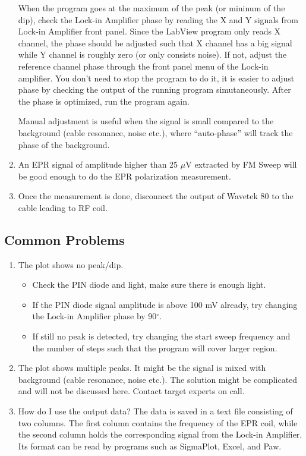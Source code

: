 \begin{enumerate}
When the program goes at the maximum of the peak (or mininum of the dip), 
check the Lock-in Amplifier phase by reading the X and Y signals from Lock-in
Amplifier front panel.  Since the LabView program only reads X channel, the 
phase should be adjusted such that X channel has a big signal while 
Y channel is roughly zero (or only consists noise).  If not, adjust the 
reference channel phase through the front panel menu of the Lock-in amplifier.
You don't need to stop the program to do it, it is easier to adjust phase
by checking the output of the running program simutaneously.  
After the phase is optimized, run the program again.

Manual adjustment is useful when the signal is small compared to the background
(cable resonance, noise etc.), where ``auto-phase'' will track the phase of the 
background.

\item An EPR signal of amplitude higher than 25 $\mu$V extracted by FM Sweep
will be good enough to do the EPR polarization measurement.

\item Once the measurement is done, disconnect the output of 
Wavetek 80 to the cable leading to RF coil.

\end{enumerate}

\subsection{Common Problems}
\begin{enumerate}

\item The plot shows no peak/dip. 
\begin{itemize}
\item Check the PIN diode and light, make sure there is enough light.
\item  If the PIN diode signal amplitude is above 100 mV already, try changing the 
Lock-in Amplifier phase by 90$^\circ$.
\item  If still no peak is detected, try changing the 
start sweep frequency and the number of steps such that the program
will cover larger region.
\end{itemize}

\item The plot shows multiple peaks.  It might be the signal is mixed with 
background (cable resonance, noise etc.).  The solution might be complicated
and will not be discussed here.  Contact target experts on call.


\item How do I use the output data? The data is saved in a text
file consisting of two columns.  The first column contains the frequency
of the EPR coil, while the second column holds the corresponding signal from the
Lock-in Amplifier.  Its format can be read by programs such as SigmaPlot, Excel, and Paw.

\end{enumerate}

